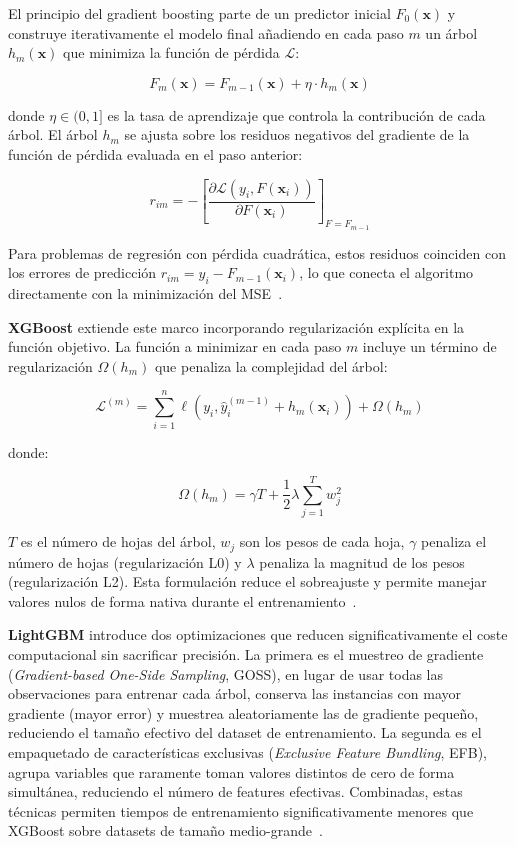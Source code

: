 \documentclass[12pt, a4paper]{article}
\begin{document}
El principio del gradient boosting parte de un predictor inicial $F_0(\mathbf{x})$ y construye iterativamente el modelo final añadiendo en cada paso $m$ un árbol $h_m(\mathbf{x})$ que minimiza la función de pérdida $\mathcal{L}$:

\begin{equation}
F_m(\mathbf{x}) = F_{m-1}(\mathbf{x}) + \eta \cdot h_m(\mathbf{x})
\end{equation}

donde $\eta \in (0,1]$ es la tasa de aprendizaje que controla la contribución de cada árbol. El árbol $h_m$ se ajusta sobre los residuos negativos del gradiente de la función de pérdida evaluada en el paso anterior:

\begin{equation}
r_{im} = -\left[\frac{\partial \mathcal{L}(y_i, F(\mathbf{x}_i))}{\partial F(\mathbf{x}_i)}\right]_{F=F_{m-1}}
\end{equation}

Para problemas de regresión con pérdida cuadrática, estos residuos coinciden con los errores de predicción $r_{im} = y_i - F_{m-1}(\mathbf{x}_i)$, lo que conecta el algoritmo directamente con la minimización del MSE~\cite{chen2016}.

\textbf{XGBoost} extiende este marco incorporando regularización explícita en la función objetivo. La función a minimizar en cada paso $m$ incluye un término de regularización $\Omega(h_m)$ que penaliza la complejidad del árbol:

\begin{equation}
\mathcal{L}^{(m)} = \sum_{i=1}^{n} \ell(y_i, \hat{y}_i^{(m-1)} + h_m(\mathbf{x}_i)) + \Omega(h_m)
\end{equation}

donde:

\begin{equation}
\Omega(h_m) = \gamma T + \frac{1}{2}\lambda \sum_{j=1}^{T} w_j^2
\end{equation}

$T$ es el número de hojas del árbol, $w_j$ son los pesos de cada hoja, $\gamma$ penaliza el número de hojas (regularización L0) y $\lambda$ penaliza la magnitud de los pesos (regularización L2). Esta formulación reduce el sobreajuste y permite manejar valores nulos de forma nativa durante el entrenamiento~\cite{chen2016}.

\textbf{LightGBM} introduce dos optimizaciones que reducen significativamente el coste computacional sin sacrificar precisión. La primera es el muestreo de gradiente (\textit{Gradient-based One-Side Sampling}, GOSS), en lugar de usar todas las observaciones para entrenar cada árbol, conserva las instancias con mayor gradiente (mayor error) y muestrea aleatoriamente las de gradiente pequeño, reduciendo el tamaño efectivo del dataset de entrenamiento. La segunda es el empaquetado de características exclusivas (\textit{Exclusive Feature Bundling}, EFB), agrupa variables que raramente toman valores distintos de cero de forma simultánea, reduciendo el número de features efectivas. Combinadas, estas técnicas permiten tiempos de entrenamiento significativamente menores que XGBoost sobre datasets de tamaño medio-grande~\cite{ke2017}.
\end{document}
